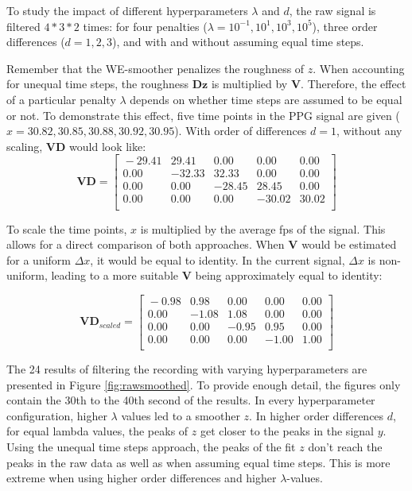 \documentclass[twocolumn]{bmcart}%
\begin{document}
To study the impact of different hyperparameters $\lambda$ and $d$, the raw signal is filtered $4 * 3 * 2$ times: for four penalties ($\lambda = 10^{-1}, 10^1, 10^3,  10^5$),
three order differences ($d = 1, 2, 3$), 
and with and without assuming equal time steps. 

Remember that the WE-smoother penalizes the roughness of $z$. 
When accounting for unequal time steps, the roughness $\mathbf{Dz}$ is multiplied by $\mathbf{V}$. 
Therefore, the effect of a particular penalty $\lambda$ depends on whether time steps are assumed to be equal or not. 
To demonstrate this effect, five time points in the PPG signal are given 
($x = 30.82, 30.85, 30.88,  30.92, 30.95$). 
With order of differences $d = 1$, without any scaling, $\mathbf{VD}$ would look like: 
\[
\mathbf{VD} =
\begin{bmatrix}{}
  -29.41 & 29.41 & 0.00 & 0.00 & 0.00 \\ 
  0.00 & -32.33 & 32.33 & 0.00 & 0.00 \\ 
  0.00 & 0.00 & -28.45 & 28.45 & 0.00 \\ 
  0.00 & 0.00 & 0.00 & -30.02 & 30.02 \\ 
  \end{bmatrix}
\]

To scale the time points, $x$ is multiplied by the average fps of the signal.
This allows for a direct comparison of both approaches. 
When $\mathbf{V}$ would be estimated for a uniform $\Delta x$, it would be equal to identity.   
In the current signal, $\Delta x$ is non-uniform, leading to a more suitable $\mathbf{V}$ being approximately equal to identity: 

\[ 
\mathbf{VD}_{scaled} = 
\begin{bmatrix}{}
  -0.98 & 0.98 & 0.00 & 0.00 & 0.00 \\ 
  0.00 & -1.08 & 1.08 & 0.00 & 0.00 \\ 
  0.00 & 0.00 & -0.95 & 0.95 & 0.00 \\ 
  0.00 & 0.00 & 0.00 & -1.00 & 1.00 \\ 
  \end{bmatrix}
\]

The 24 results of filtering the recording with varying hyperparameters are presented in Figure \ref{fig:rawsmoothed}. 
To provide enough detail, the figures only contain the 30th to the 40th second of the results.
In every hyperparameter configuration, higher $\lambda$ values led to a smoother $z$. 
In higher order differences $d$, for equal lambda values, the peaks of $z$ get closer to the peaks in the signal $y$. 
Using the unequal time steps approach, the peaks of the fit $z$ don't reach the peaks in the raw data as well as when assuming equal time steps. 
This is more extreme when using higher order differences and higher $\lambda$-values. 
\end{document}
